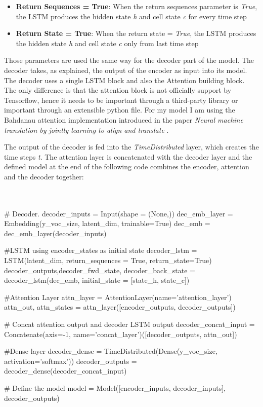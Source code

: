 \begin{itemize}
	\item \textbf{Return Sequences = True}: When the return sequences parameter is \textit{True}, the LSTM produces the hidden state \textit{h} and cell state \textit{c} for every time step
	\item \textbf{Return State = True}: When the return state = \textit{True}, the LSTM produces the hidden state \textit{h} and cell state \textit{c} only from last time step 
\end{itemize}

Those parameters are used the same way for the decoder part of the model. The decoder takes, as explained, the output of the encoder as input into its model. The decoder uses a single LSTM block and also the Attention building block. The only difference is that the attention block is not officially support by Tensorflow, hence it needs to be important through a third-party library or important through an extensible python file. For my model I am using the Bahdanau attention implementation introduced in the paper \textit{Neural machine translation by jointly learning to align and translate} \cite{bah}.

The output of the decoder is fed into the \textit{TimeDistributed} layer, which creates the time steps \textit{t}. The attention layer is concatenated with the decoder layer and the defined model at the end of the following code combines the encoder, attention and the decoder together: \\ \\ \\

\begin{python}
# Decoder. 
decoder_inputs = Input(shape = (None,)) 
dec_emb_layer = Embedding(y_voc_size, latent_dim, trainable=True) 
dec_emb = dec_emb_layer(decoder_inputs) 

#LSTM using encoder_states as initial state
decoder_lstm = LSTM(latent_dim, return_sequences = True, return_state=True) 
decoder_outputs,decoder_fwd_state, decoder_back_state = decoder_lstm(dec_emb, initial_state = [state_h, state_c]) 

#Attention Layer
attn_layer = AttentionLayer(name='attention_layer') 
attn_out, attn_states = attn_layer([encoder_outputs, decoder_outputs]) 

# Concat attention output and decoder LSTM output 
decoder_concat_input = Concatenate(axis=-1, name='concat_layer')([decoder_outputs, attn_out])

#Dense layer
decoder_dense = TimeDistributed(Dense(y_voc_size, activation='softmax')) 
decoder_outputs = decoder_dense(decoder_concat_input) 

# Define the model
model = Model([encoder_inputs, decoder_inputs], decoder_outputs) 
\end{python}

